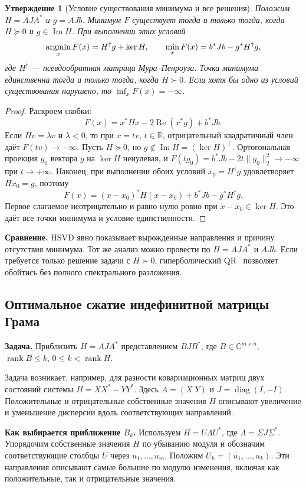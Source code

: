 \documentclass[a4paper,12pt]{article}
\DeclareMathOperator{\rank}{rank}
\DeclareMathOperator{\diag}{diag}
\theoremstyle{csstyle}
\newtheorem{proposition}[theorem]{Утверждение}
\DeclareMathOperator{\im}{Im}
\newcommand{\HSVDComplex}{\mathbb C}
\begin{document}
\begin{proposition}[Условие существования минимума и все решения]
\label{prop:app-ils}
Положим $H=AJA^*$ и $g=AJb$. Минимум $F$ существует тогда и только тогда, когда
$H\succeq0$ и $g\in\im H$. При выполнении этих условий
\[
\mathop{\rm argmin}_x F(x)=H^\dagger g+\ker H,
\qquad
\min_x F(x)=b^*Jb-g^*H^\dagger g,
\]
где $H^\dagger$ --- псевдообратная матрица Мура--Пенроуза.
Точка минимума единственна тогда и только тогда, когда $H\succ0$.
Если хотя бы одно из условий существования нарушено, то
$\inf_x F(x)=-\infty$.
\end{proposition}
\begin{proof}
Раскроем скобки:
\[
F(x)=x^*Hx-2\operatorname{Re}(x^*g)+b^*Jb.
\]
Если $Hv=\lambda v$ и $\lambda<0$, то при $x=tv$, $t\in\mathbb R$,
отрицательный квадратичный член даёт $F(tv)\to-\infty$.
Пусть $H\succeq0$, но $g\notin\im H=(\ker H)^\perp$.
Ортогональная проекция $g_0$ вектора $g$ на $\ker H$ ненулевая,
и $F(tg_0)=b^*Jb-2t\|g_0\|_2^2\to-\infty$ при $t\to+\infty$.
Наконец, при выполнении обоих условий $x_0=H^\dagger g$ удовлетворяет
$Hx_0=g$, поэтому
\[
F(x)=(x-x_0)^*H(x-x_0)+b^*Jb-g^*H^\dagger g.
\]
Первое слагаемое неотрицательно и равно нулю ровно при
$x-x_0\in\ker H$. Это даёт все точки минимума и условие единственности.
\end{proof}

\textbf{Сравнение.}
HSVD явно показывает вырожденные направления и причину отсутствия минимума.
Тот же анализ можно провести по $H=AJA^*$ и $AJb$.
Если требуется только решение задачи с $H\succ0$,
гиперболический QR~\cite{ILS}
позволяет обойтись без полного спектрального разложения.


\subsection{Оптимальное сжатие индефинитной матрицы Грама}
\textbf{Задача.}
Приблизить $H=AJA^*$ представлением $BJB^*$,
где $B\in\HSVDComplex^{m\times n}$, $\rank B\le k$,
$0\le k<\rank H$.

Задача возникает, например, для разности ковариационных матриц
двух состояний системы $H=XX^*-YY^*$.
Здесь $A=(X\;Y)$ и $J=\diag(I,-I)$.
Положительные и отрицательные собственные значения $H$ описывают
увеличение и уменьшение дисперсии вдоль соответствующих направлений.

\textbf{Как выбирается приближение $B_k$.}
Используем $H=U\Lambda U^*$, где $\Lambda=\Sigma J\Sigma^*$.
Упорядочим собственные значения $H$ по убыванию модуля
и обозначим соответствующие столбцы $U$ через $u_1,\ldots,u_m$.
Положим $U_k=(u_1,\ldots,u_k)$.
Эти направления описывают самые большие по модулю изменения,
включая как положительные, так и отрицательные значения.
\end{document}
